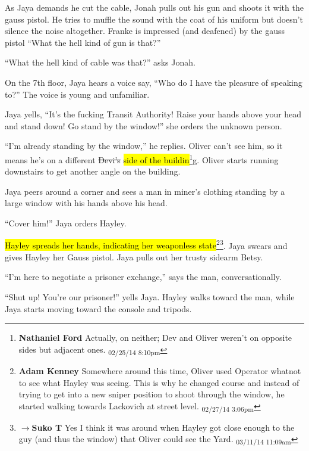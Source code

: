 As Jaya demands he cut the cable, Jonah pulls out his gun and shoots it with the gauss pistol.  He tries to muffle the sound with the coat of his uniform but doesn't silence the noise altogether. Franke is impressed (and deafened) by the gauss pistol ``What the hell kind of gun is that?''  

``What the hell kind of cable was that?'' asks Jonah.



On the 7th floor, Jaya hears a voice say, ``Who do I have the pleasure of speaking to?''  The voice is young and unfamiliar.



Jaya yells, ``It's the fucking Transit Authority!  Raise your hands above your head and stand down!  Go stand by the window!'' she orders the unknown person.  

``I'm already standing by the window,'' he replies.  Oliver can't see him, so it means he's on a different  \sout{Devi's}\hl{ side of the buildin}\footnote{\textbf{Nathaniel Ford }Actually, on neither; Dev and Oliver weren't on opposite sides but adjacent ones. \textsubscript{02/25/14 8:10pm}}g.  Oliver starts running downstairs to get another angle on the building.



Jaya peers around a corner and sees a man in miner's clothing standing by a large window with his hands above his head.



``Cover him!'' Jaya orders Hayley.

\hl{Hayley spreads her hands, indicating her weaponless state}\footnote{\textbf{Adam Kenney }Somewhere around this time, Oliver used Operator whatnot to see what Hayley was seeing. This is why he changed course and instead of trying to get into a new sniper position to shoot through the window, he started walking towards Lackovich at street level. \textsubscript{02/27/14 3:06pm}}\footnote{$\rightarrow$\textbf{Suko T }Yes I think it was around when Hayley got close enough to the guy (and thus the window) that Oliver could see the Yard. \textsubscript{03/11/14 11:09am}}.  Jaya swears and gives Hayley her Gauss pistol.  Jaya pulls out her trusty sidearm Betsy.  



``I'm here to negotiate a prisoner exchange,'' says the man, conversationally.

``Shut up!  You're our prisoner!'' yells Jaya.  Hayley walks toward the man, while Jaya starts moving toward the console and tripods.



